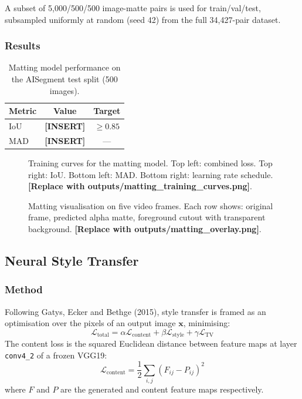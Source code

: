 A subset of 5,000/500/500 image-matte pairs is used for train/val/test,
subsampled uniformly at random (seed 42) from the full 34,427-pair dataset.

\subsubsection{Results}

\begin{table}[h]
\centering
\caption{Matting model performance on the AISegment test split (500 images).}
\begin{tabular}{lcc}
\toprule
Metric & Value & Target \\
\midrule
IoU  & \textbf{[INSERT]} & $\geq 0.85$ \\
MAD  & \textbf{[INSERT]} & --- \\
\bottomrule
\end{tabular}
\end{table}

\begin{figure}[h]
\centering
\fbox{\rule{0pt}{4.5cm}\rule{\linewidth}{0pt}}
\caption{Training curves for the matting model. Top left: combined loss. Top right: IoU.
Bottom left: MAD. Bottom right: learning rate schedule. \textbf{[Replace with
outputs/matting\_training\_curves.png]}.}
\label{fig:matting_curves}
\end{figure}

\begin{figure}[h]
\centering
\fbox{\rule{0pt}{4cm}\rule{\linewidth}{0pt}}
\caption{Matting visualisation on five video frames. Each row shows: original frame,
predicted alpha matte, foreground cutout with transparent background.
\textbf{[Replace with outputs/matting\_overlay.png]}.}
\label{fig:matting_overlay}
\end{figure}

\subsection{Neural Style Transfer}

\subsubsection{Method}

Following Gatys, Ecker and Bethge (2015), style transfer is framed as an optimisation
over the pixels of an output image $\mathbf{x}$, minimising:
\begin{equation}
  \mathcal{L}_{\text{total}} = \alpha \mathcal{L}_{\text{content}} +
                                \beta  \mathcal{L}_{\text{style}} +
                                \gamma \mathcal{L}_{\text{TV}}
\end{equation}
The content loss is the squared Euclidean distance between feature maps at layer
\texttt{conv4\_2} of a frozen VGG19:
\begin{equation}
  \mathcal{L}_{\text{content}} = \frac{1}{2}\sum_{i,j}(F_{ij} - P_{ij})^2
\end{equation}
where $F$ and $P$ are the generated and content feature maps respectively.

